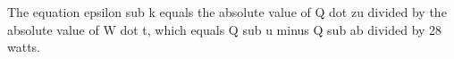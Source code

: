 The equation epsilon sub k equals the absolute value of Q dot zu divided by the absolute value of W dot t, which equals Q sub u minus Q sub ab divided by 28 watts.
